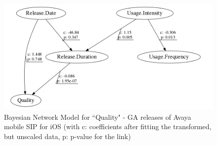 \documentclass[smallextended]{svjour3}       %
\begin{document}
\begin{figure}[!t]
\centering
\includegraphics[width=0.6\linewidth]{qI}%
\caption{Bayesian Network  Model for ``Quality" - GA releases of Avaya mobile SIP for iOS (with c: coefficients after fitting the transformed, but unscaled data, p: p-value  for the link)}
\label{fig:bn2I}
\vspace{-10pt}
\end{figure}
\end{document}
